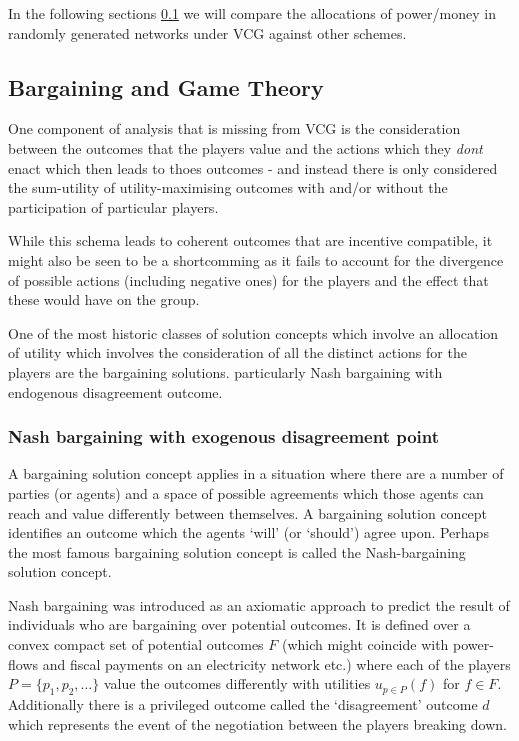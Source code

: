 In the following sections \ref{} we will compare the allocations of power/money in randomly generated networks under VCG against other schemes.


\subsection{Bargaining and Game Theory}

One component of analysis that is missing from VCG is the consideration between the outcomes that the players value and the actions which they \textit{dont} enact which then leads to thoes outcomes - and instead there is only considered the sum-utility of utility-maximising outcomes with and/or without the participation of particular players.

While this schema leads to coherent outcomes that are incentive compatible, it might also be seen to be a shortcomming as it fails to account for the divergence of possible actions (including negative ones) for the players and the effect that these would have on the group.

One of the most historic classes of solution concepts which involve an allocation of utility which involves the consideration of all the distinct actions for the players are the bargaining solutions.
particularly Nash bargaining with endogenous disagreement outcome.

\subsubsection{Nash bargaining with exogenous disagreement point}\label{sec:nash_bargaining_exogenous}

A bargaining solution concept applies in a situation where there are a number of parties (or agents) and a space of possible agreements which those agents can reach and value differently between themselves.
A bargaining solution concept identifies an outcome which the agents `will' (or `should') agree upon.
Perhaps the most famous bargaining solution concept is called the Nash-bargaining solution concept.

Nash bargaining was introduced \cite{nash1} as an axiomatic approach to predict the result of individuals who are bargaining over potential outcomes.
It is defined over a convex compact set of potential outcomes $F$ (which might coincide with power-flows and fiscal payments on an electricity network etc.) 
where each of the players $P=\{p_1,p_2,\dots\}$ value the outcomes differently with utilities $u_{p\in P}(f)$ for $f\in F$.
Additionally there is a privileged outcome called the `disagreement' outcome $d$ which represents the event of the negotiation between the players breaking down.

